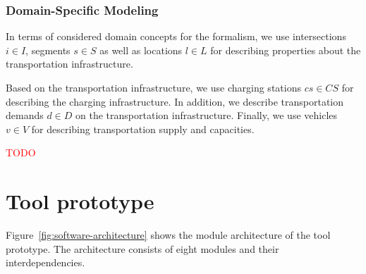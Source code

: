 \documentclass[10pt,twocolumn]{article}
\begin{document}
\subsubsection{Domain-Specific Modeling}
\label{sec:domain-specific-modeling}


In terms of considered domain concepts for the formalism, we use intersections $i \in I$, segments $s \in S$ as well as locations $l \in L$ for describing properties about the transportation infrastructure.

Based on the transportation infrastructure, we use charging stations $cs \in CS$ for describing the charging infrastructure. In addition, we describe transportation demands $d \in D$ on the transportation infrastructure. 
Finally, we use vehicles $v \in V$ for describing transportation supply and capacities.

\textcolor{red}{TODO}

\section{Tool prototype}
\label{sec:tool-prototype}

Figure~\ref{fig:software-architecture} shows the module architecture of the tool prototype.
The architecture consists of eight modules and their interdependencies.
\end{document}
